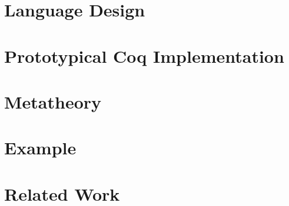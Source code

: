 
\section{Language Design}
\label{sec:lang-design}




\newcommand{\denotes}[1]{{\llbracket {#1} \rrbracket}}
\newcommand{\denotesS}[1]{{{\llbracket {#1} \rrbracket}_S}}
\newcommand{\goodCtx}[2]{{ {#1} \ \vdash }}
\newcommand{\goodType}[3]{{ {#1} \vdash {#2} }}
\newcommand{\goodTerm}[3]{{ {#1} \vdash {#2} : {#3} }}
\newcommand{\goodSub}[3]{{ {#1} \vdash {#2} : {#3} }}
\newcommand{\goodSig}[3]{{ {#1} \vdash {#2} \ \  Sig^{#3} }}
\newcommand{\goodWSig}[3]{{ {#1} \vdash {#2} \ \ WSig^{#3} }}
\newcommand{\goodSeal}[4]{{ {#1} \vdash {#2} : {#3} \  |\  {#4} }}
\newcommand{\goodInh}[4]{{ {#1} \vdash {#2} : {#3} \twoheadrightarrow {#4}}}
\newcommand{\nat}{\mathbf{N}}

\newcommand{\cU}{{\mathcal{U}}}
\newcommand{\cB}{{\mathbb{B}}}
\newcommand{\cL}{{\mathcal{L}}}
\newcommand{\cC}{{\mathcal{C}}}
\newcommand{\cCt}{{\mathcal{C}_t}}
\newcommand{\bW}{{\mathbb{W}}}



\section{Prototypical Coq Implementation}
\label{sec:coqimpl}


\section{Metatheory}

\label{sec:metatheory}





\section{Example}\label{sec:coqexample}


\section{Related Work}\label{sec:related-work}


